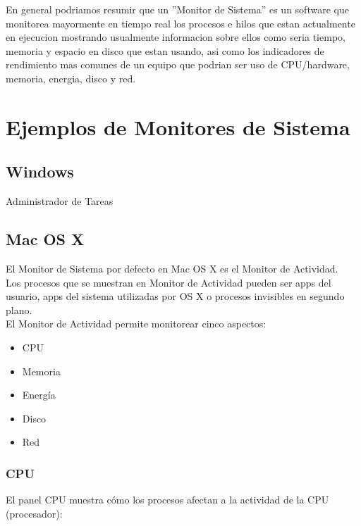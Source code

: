 \documentclass[a4paper,11pt]{article}
\begin{document}
En general podriamos resumir que un ''Monitor de Sistema'' es un software que monitorea mayormente en tiempo real los procesos e hilos que estan actualmente en ejecucion mostrando usualmente informacion sobre ellos como seria tiempo, memoria y espacio en disco que estan usando, asi como los indicadores de rendimiento mas comunes de un equipo que podrian ser uso de CPU/hardware, memoria, energia, disco y red.

\section{Ejemplos de Monitores de Sistema}

\subsection{Windows}

Administrador de Tareas

\subsection{Mac OS X}

\cite{ref:web4} El Monitor de Sistema por defecto en Mac OS X es el Monitor de Actividad.\\

Los procesos que se muestran en Monitor de Actividad pueden ser apps del usuario, apps del sistema utilizadas por OS X o procesos invisibles en segundo plano.\\

El Monitor de Actividad permite monitorear cinco aspectos:
\begin{itemize}
  \item CPU
  \item Memoria
  \item Energía
  \item Disco
  \item Red
\end{itemize}

\subsubsection{CPU}

El panel CPU muestra cómo los procesos afectan a la actividad de la CPU (procesador):
\end{document}
